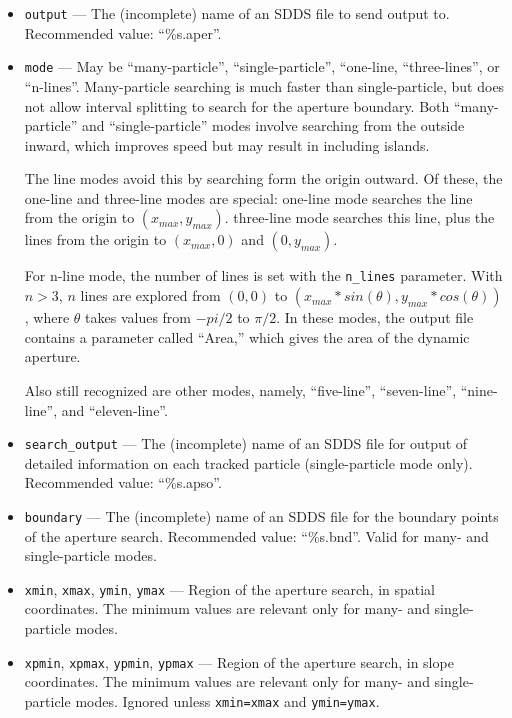 \documentclass[11pt]{article}
\begin{document}
\begin{itemize}
\item \verb|output| --- The (incomplete) name of an SDDS file to send output to.  
 Recommended value: ``\%s.aper''.

\item \verb|mode| --- May be ``many-particle'', ``single-particle'', ``one-line, ``three-lines'', or ``n-lines''.
Many-particle searching is much
faster than single-particle, but does not allow interval splitting to
search for the aperture boundary.  Both ``many-particle'' and
``single-particle'' modes involve searching from the outside inward,
which improves speed but may result in including islands.

The line modes avoid this by searching form the origin
outward.  Of these, the one-line and three-line modes are special:
one-line mode searches the line from the origin to $(x_{max},
y_{max})$.  three-line mode searches this line, plus the lines from
the origin to $(x_{max}, 0)$ and $(0, y_{max})$.  

For n-line mode, the number of lines is set with the \verb|n_lines| parameter.
With $n>3$, $n$ lines are explored from $(0,0)$ to
$(x_{max}*sin(\theta), y_{max}*cos(\theta))$, where $\theta$ takes
values from $-pi/2$ to $\pi/2$.   In these modes, the output file contains
a parameter called ``Area,'' which gives the area of the dynamic aperture.

Also still recognized are other modes, namely, ``five-line'', ``seven-line'', ``nine-line'',
and ``eleven-line''.

\item \verb|search_output| --- The (incomplete) name of an SDDS file for output of detailed
 information on each tracked particle (single-particle mode only).  Recommended value:
 ``\%s.apso''.

\item \verb|boundary| --- The (incomplete) name of an SDDS 
file for the boundary points of the aperture search.  Recommended value: ``\%s.bnd''.
Valid for many- and single-particle modes.

\item \verb|xmin|, \verb|xmax|, \verb|ymin|, \verb|ymax| ---
  Region of the aperture search, in spatial coordinates. The minimum values are relevant only for many- and single-particle modes.

\item \verb|xpmin|, \verb|xpmax|, \verb|ypmin|, \verb|ypmax| ---
  Region of the aperture search, in slope coordinates. The minimum values are relevant only for many- and single-particle modes.
  Ignored unless \verb|xmin=xmax| and \verb|ymin=ymax|.


\end{itemize}
\end{document}
